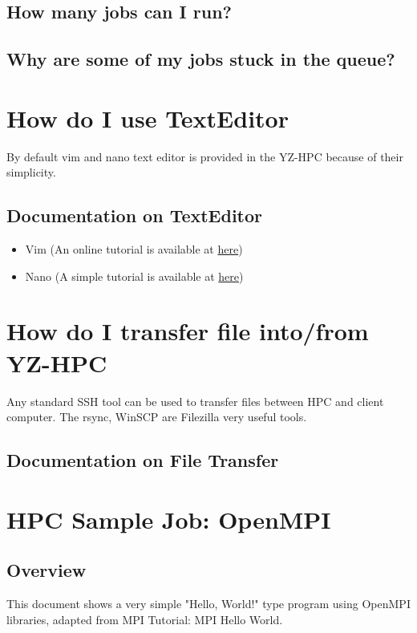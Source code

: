 \documentclass[11pt]{article}
\numberwithin{figure}{section}
\begin{document}
\subsection{How many jobs can I run?}
\subsection{Why are some of my jobs stuck in the queue?}

\section{How do I use TextEditor}
\label{section_editor}
By default vim and nano text editor is provided in the YZ-HPC because of their
simplicity.

\subsection{Documentation on TextEditor}
\begin{itemize}
    \item Vim (An online tutorial is available at \href{http://www.openvim.com}{here})
    \item Nano (A simple tutorial is available at \href{https://staffwww.fullcoll.edu/sedwards/Nano/IntroToNano.html}{here}) 
\end{itemize}

\section{How do I transfer file into/from YZ-HPC}
\label{section_transfer}
Any standard SSH tool can be used to transfer files between HPC and client
computer. The rsync, WinSCP are Filezilla very useful tools.

\subsection{Documentation on File Transfer}

\section{HPC Sample Job: OpenMPI}
\subsection{Overview}
This document shows a very simple "Hello, World!" type program using OpenMPI
libraries, adapted from MPI Tutorial: MPI Hello World.
\end{document}
